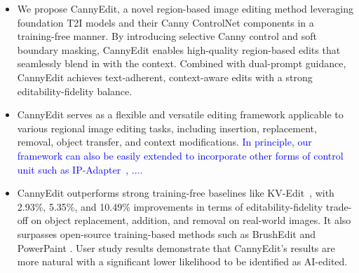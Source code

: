 \documentclass{article}
\newcommand{\kc}[1]{\textcolor{blue}{#1}}
\begin{document}
\vspace{-1mm}
\begin{itemize}[leftmargin=5mm]
\item We propose CannyEdit, a novel region-based image editing method leveraging foundation T2I models and their Canny ControlNet components in a training-free manner. By introducing selective Canny control and soft boundary masking, CannyEdit enables high-quality region-based edits that seamlessly blend in with the context. Combined with dual-prompt guidance, CannyEdit achieves text-adherent, context-aware edits with a strong editability-fidelity balance.

\vspace{-1mm}

\item CannyEdit serves as a flexible and versatile editing framework applicable to various regional image editing tasks, including insertion, replacement, removal, object transfer, and context modifications.
\kc{In principle, our framework can also be easily extended to incorporate other forms of control unit such as IP-Adapter~\cite{}, ....}

\vspace{-1mm}

\item CannyEdit outperforms strong training-free baselines like KV-Edit~\citep{zhu2025kv}, with 2.93\%, 5.35\%, and 10.49\% improvements in terms of editability-fidelity trade-off on object replacement, addition, and removal on real-world images. It also surpasses open-source training-based methods such as BrushEdit \citep{li2024brushedit} and PowerPaint \citep{zhuang2023task}. User study results demonstrate that CannyEdit's results are more natural with a significant lower likelihood to be identified as AI-edited.  %

\end{itemize}

\end{document}
